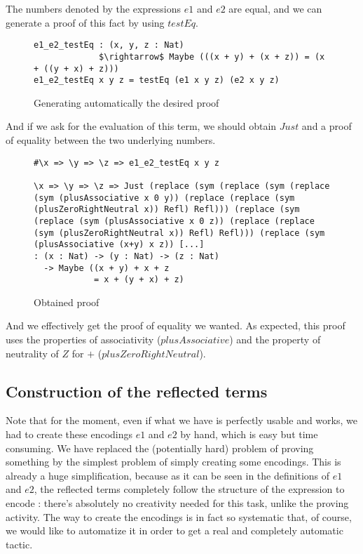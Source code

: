 The numbers denoted by the expressions $e1$ and $e2$ are equal, and we can generate a proof of this fact by using $testEq$.

\begin{figure}[H]
\figrule
\begin{center}
\begin{lstlisting}
e1_e2_testEq : (x, y, z : Nat) 
             $\rightarrow$ Maybe (((x + y) + (x + z)) = (x + ((y + x) + z)))
e1_e2_testEq x y z = testEq (e1 x y z) (e2 x y z)
\end{lstlisting}
\end{center}
\caption{Generating automatically the desired proof}
\figrule
\end{figure}


And if we ask for the evaluation of this term, we should obtain $Just$ and a proof of equality between the two underlying numbers.

\begin{figure}[H]
\figrule
\begin{center}
\begin{lstlisting}
#\x => \y => \z => e1_e2_testEq x y z

\x => \y => \z => Just (replace (sym (replace (sym (replace 
(sym (plusAssociative x 0 y)) (replace (replace (sym 
(plusZeroRightNeutral x)) Refl) Refl))) (replace (sym 
(replace (sym (plusAssociative x 0 z)) (replace (replace 
(sym (plusZeroRightNeutral x)) Refl) Refl))) (replace (sym 
(plusAssociative (x+y) x z)) [...]
: (x : Nat) -> (y : Nat) -> (z : Nat) 
  -> Maybe ((x + y) + x + z 
            = x + (y + x) + z)
\end{lstlisting}
\end{center}
\caption{Obtained proof}
\figrule
\end{figure}

And we effectively get the proof of equality we wanted. As expected, this proof uses the properties of associativity ($plusAssociative$) and the property of neutrality of $Z$ for $+$ ($plusZeroRightNeutral$).


\subsection{Construction of the reflected terms}

Note that for the moment, even if what we have is perfectly usable and works, we had to create these encodings $e1$ and $e2$ by hand, which is easy but time consuming. We have replaced the (potentially hard) problem of proving something by the simplest problem of simply creating some encodings. This is already a huge simplification, because as it can be seen in the definitions of $e1$ and $e2$, the reflected terms completely follow the structure of the expression to encode : there's absolutely no creativity needed for this task, unlike the proving activity. The way to create the encodings is in fact so systematic that, of course, we would like to automatize it in order to get a real and completely automatic tactic.

